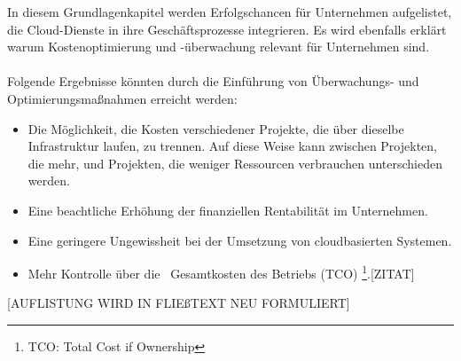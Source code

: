 In diesem Grundlagenkapitel werden Erfolgschancen für Unternehmen aufgelistet, die Cloud-Dienste in ihre Geschäftsprozesse integrieren.
Es wird ebenfalls erklärt warum Kostenoptimierung und -überwachung relevant für Unternehmen sind.
\\\\
Folgende Ergebnisse könnten durch die Einführung von Überwachungs- und Optimierungsmaßnahmen erreicht werden:
\begin{itemize}
      \item
            Die Möglichkeit, die Kosten verschiedener Projekte, die über dieselbe Infrastruktur laufen, zu trennen.
            Auf diese Weise kann zwischen Projekten, die mehr, und Projekten, die weniger Ressourcen verbrauchen unterschieden werden.%
      \item
            Eine beachtliche Erhöhung der finanziellen Rentabilität im Unternehmen.%
      \item
            Eine geringere Ungewissheit bei der Umsetzung von cloudbasierten Systemen.
      \item
            Mehr Kontrolle über die  Gesamtkosten des Betriebs (TCO)     \footnote{TCO: Total Cost if Ownership}.[ZITAT]

\end{itemize}
[AUFLISTUNG WIRD IN FLIEßTEXT NEU FORMULIERT]



